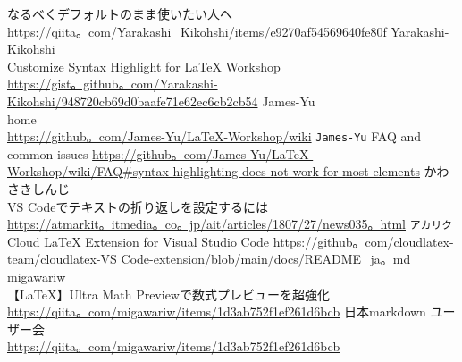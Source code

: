 \documentclass{ltjsarticle}
\begin{document}
\begin{thebibliography}{999}
  なるべくデフォルトのまま使いたい人へ\\
  \url{https://qiita。com/Yarakashi_Kikohshi/items/e9270af54569640fe80f}
  Yarakashi-Kikohshi\\
  Customize Syntax Highlight for LaTeX Workshop\\
  \url{https://gist。github。com/Yarakashi-Kikohshi/948720cb69d0baafe71e62ec6cb2cb54}
  James-Yu\\
  home\\
  \url{https://github。com/James-Yu/LaTeX-Workshop/wiki}
  \verb|James-Yu|
  FAQ and common issues
  \url{https://github。com/James-Yu/LaTeX-Workshop/wiki/FAQ#syntax-highlighting-does-not-work-for-most-elements}
  かわさきしんじ\\
  VS Codeでテキストの折り返しを設定するには\\
  \url{https://atmarkit。itmedia。co。jp/ait/articles/1807/27/news035。html}
  \verb|アカリク|\\
  Cloud LaTeX Extension for Visual Studio Code
  \url{https://github。com/cloudlatex-team/cloudlatex-VS Code-extension/blob/main/docs/README_ja。md}
  migawariw\\
  【LaTeX】Ultra Math Previewで数式プレビューを超強化\\
  \url{https://qiita。com/migawariw/items/1d3ab752f1ef261d6bcb}
  日本markdown ユーザー会\\
  \url{https://qiita。com/migawariw/items/1d3ab752f1ef261d6bcb}
\end{thebibliography}
\end{document}
